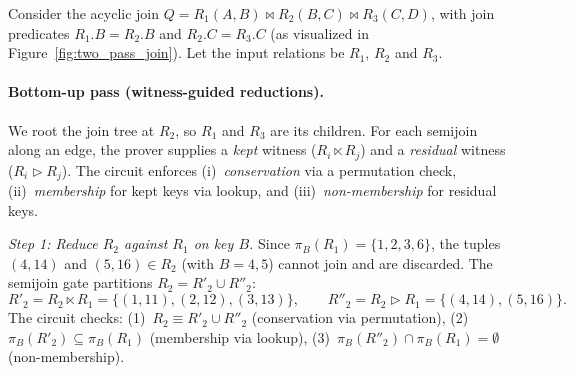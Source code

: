 \documentclass[sigconf]{acmart}
\renewcommand{\emph}[1]{\textit{#1}}
\begin{document}
\vspace{-0.1in}
\begin{example}
\label{ex:two_pass_obj_full}
\label{ex:two_pass_obj_bottom_up}
Consider the acyclic join
$Q = R_1(A,B) \bowtie R_2(B,C) \bowtie R_3(C,D)$,
with join predicates $R_1.B = R_2.B$ and $R_2.C = R_3.C$
(as visualized in Figure~\ref{fig:two_pass_join}).
Let the input relations be $R_1$, $R_2$ and $R_3$.
\vspace{-0.1in}
\paragraph{Bottom-up pass (witness-guided reductions).}
We root the join tree at $R_2$, so $R_1$ and $R_3$ are its children.
For each semijoin along an edge, the prover supplies a \emph{kept} witness
($R_i \ltimes R_j$) and a \emph{residual} witness ($R_i \rhd R_j$).
The circuit enforces (i)~\emph{conservation} via a permutation check,
(ii)~\emph{membership} for kept keys via lookup, and
(iii)~\emph{non-membership} for residual keys.

\smallskip
\noindent\emph{Step 1: Reduce $R_2$ against $R_1$ on key $B$.}
Since $\pi_B(R_1)=\{1,2,3,6\}$, the tuples $(4,14)$ and $(5,16)\in R_2$ (with $B=4,5$) cannot join and are discarded.
The semijoin gate partitions $R_2 = R'_2 \cup R''_2$:
\[
R'_2 = R_2 \ltimes R_1 =\{(1,11),(2,12),(3,13)\}, \qquad R''_2 = R_2 \rhd R_1 = \{(4,14),(5,16)\}.
\]
The circuit checks:
(1)~$R_2 \equiv R'_2 \cup R''_2$ (conservation via permutation),
(2)~$\pi_B(R'_2) \subseteq \pi_B(R_1)$ (membership via lookup),
(3)~$\pi_B(R''_2) \cap \pi_B(R_1)=\emptyset$ (non-membership).


\end{example}
\end{document}

